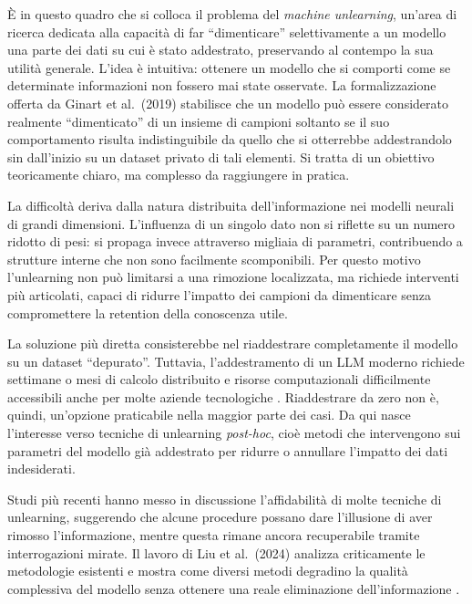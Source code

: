 È in questo quadro che si colloca il problema del \emph{machine unlearning}, un'area di ricerca dedicata alla capacità di far ``dimenticare'' selettivamente a un modello una parte dei dati su cui è stato addestrato, preservando al contempo la sua utilità generale. L’idea è intuitiva: ottenere un modello che si comporti come se determinate informazioni non fossero mai state osservate. La formalizzazione offerta da Ginart et al.\ (2019) \cite{ginart2019makingaiforgetyou} stabilisce che un modello può essere considerato realmente ``dimenticato'' di un insieme di campioni soltanto se il suo comportamento risulta indistinguibile da quello che si otterrebbe addestrandolo sin dall’inizio su un dataset privato di tali elementi. Si tratta di un obiettivo teoricamente chiaro, ma complesso da raggiungere in pratica.

La difficoltà deriva dalla natura distribuita dell’informazione nei modelli neurali di grandi dimensioni. L’influenza di un singolo dato non si riflette su un numero ridotto di pesi: si propaga invece attraverso migliaia di parametri, contribuendo a strutture interne che non sono facilmente scomponibili. Per questo motivo l’unlearning non può limitarsi a una rimozione localizzata, ma richiede interventi più articolati, capaci di ridurre l’impatto dei campioni da dimenticare senza compromettere la retention della conoscenza utile.

La soluzione più diretta consisterebbe nel riaddestrare completamente il modello su un dataset ``depurato''. Tuttavia, l’addestramento di un LLM moderno richiede settimane o mesi di calcolo distribuito e risorse computazionali difficilmente accessibili anche per molte aziende tecnologiche \cite{zhao2023survey}. Riaddestrare da zero non è,  quindi, un'opzione praticabile nella maggior parte dei casi. Da qui nasce l’interesse verso tecniche di unlearning \emph{post-hoc}, cioè metodi che intervengono sui parametri del modello già addestrato per ridurre o annullare l’impatto dei dati indesiderati.

Studi più recenti hanno messo in discussione l’affidabilità di molte tecniche di unlearning, suggerendo che alcune procedure possano dare l’illusione di aver rimosso l’informazione, mentre questa rimane ancora recuperabile tramite interrogazioni mirate. Il lavoro di Liu et al.\ (2024) analizza criticamente le metodologie esistenti e mostra come diversi metodi degradino la qualità complessiva del modello senza ottenere una reale eliminazione dell’informazione \cite{liu2024rethinkingmachineunlearninglarge}.


